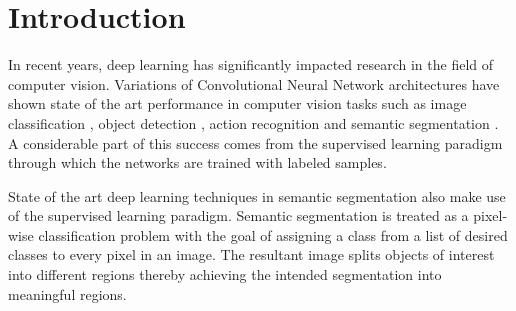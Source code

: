 
\chapter{Introduction}

In recent years, deep learning has significantly impacted research in the field of computer vision. Variations of Convolutional Neural Network architectures have shown state of the art performance in computer vision tasks such as image classification \cite{DBLP:journals/corr/HeZRS15}, object detection \cite{DBLP:journals/corr/RedmonDGF15}, action recognition \cite{DBLP:journals/corr/SimonyanZ14} and semantic segmentation \cite{DBLP:journals/corr/abs-1802-02611}. A considerable part of this success comes from the supervised learning paradigm through which the networks are trained with labeled samples.

State of the art deep learning techniques in semantic segmentation also make use of the supervised learning paradigm. Semantic segmentation is treated as a pixel-wise classification problem with the goal of assigning a class from a list of desired classes to every pixel in an image. The resultant image splits objects of interest into different regions thereby achieving the intended segmentation into meaningful regions.

